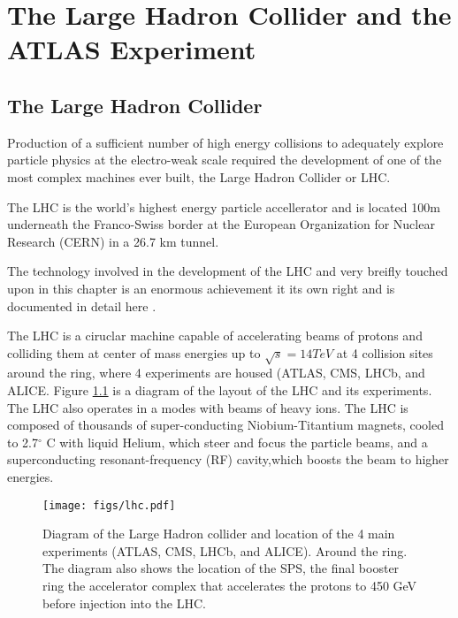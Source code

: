 \chapter[The Large Hadron Collider and the ATLAS Experiment][The Large Hadron Collider and the ATLAS Experiment]{The Large Hadron Collider and the ATLAS Experiment}
\label{chapter:lhc}
\section{The Large Hadron Collider}


Production of a sufficient number of high energy collisions to adequately explore
particle physics at the electro-weak scale required the development of one
of the most complex machines ever built, the Large Hadron Collider or LHC. 

The LHC is the world's highest energy particle accellerator 
and is located 100m underneath the Franco-Swiss border at the European Organization
for Nuclear Research (CERN) in a 26.7 km tunnel. 


The technology involved in the development of the LHC and very breifly
touched upon in this chapter is an enormous achievement
it its own right and is documented in detail here \cite{1748-0221-3-08-S08001,Pettersson:291782,Linnecar:1176380}. 


The LHC is a ciruclar 
machine capable of accelerating beams of protons and colliding them at center of mass 
energies up to $\sqrt{s} = 14 TeV$ at 4 collision sites around the ring, where 4 experiments
are housed (ATLAS\cite{ATLAS_detector}, CMS\cite{1748-0221-3-08-S08004}, LHCb\cite{1748-0221-3-08-S08005}, and ALICE\cite{1748-0221-3-08-S08002}. Figure \ref{figure:lhc_lhc} is a diagram
of the layout of the LHC and its experiments\cite{Team:40525}. The LHC also operates in a modes with beams of 
heavy ions. The LHC is composed of thousands of super-conducting Niobium-Titantium 
magnets, cooled to 2.7$^\circ$ C with liquid Helium, which steer and focus the 
particle beams, and a superconducting resonant-frequency (RF) cavity,which boosts the beam
to higher energies. 

\begin{figure}[!t]
\centering 
\texttt{[image: figs/lhc.pdf]}
\caption{ Diagram of the Large Hadron collider and location of the 4 main experiments (ATLAS, CMS, LHCb, and ALICE). Around
  the ring. The diagram also shows the location of the SPS, the final booster ring the accelerator complex that accelerates
    the protons to 450 GeV before injection into the LHC. 
}
\label{figure:lhc_lhc}
\end{figure}



